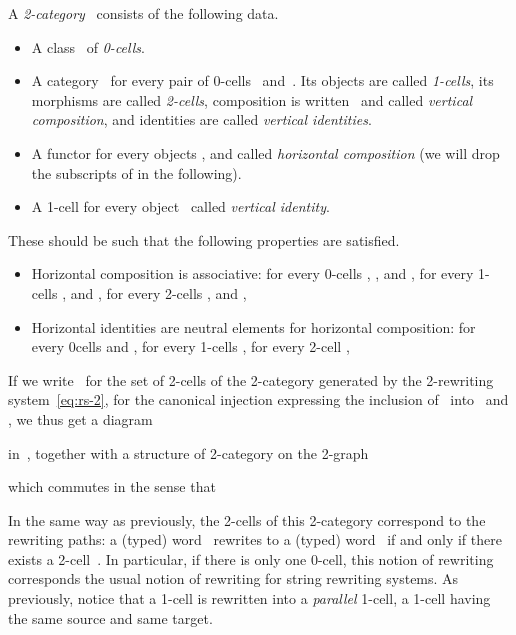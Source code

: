 \documentclass{LMCS}
\begin{document}
\begin{defi}
  \label{def:2-cat}
  A \emph{2-category}~ consists of the following data.
  \begin{itemize}
  \item A class~ of \emph{0-cells}.
  \item A category~ for every pair of 0-cells~ and~. Its objects
     are called \emph{1-cells}, its morphisms 
    are called \emph{2-cells}, composition is written~ and called
    \emph{vertical composition}, and identities are called \emph{vertical
      identities}.
  \item A functor  for every
    objects ,  and  called \emph{horizontal composition} (we will drop
    the subscripts of  in the following).
  \item A 1-cell  for every object~ called \emph{vertical
      identity}.
  \end{itemize}
  These should be such that the following properties are satisfied.
  \begin{itemize}
  \item Horizontal composition is associative: for every 0-cells , , 
    and , for every 1-cells ,  and ,
    for every 2-cells ,  and ,
    
  \item Horizontal identities are neutral elements for horizontal composition:
    for every 0\nbd{}cells  and , for every 1-cells , for
    every 2-cell ,
    
  \end{itemize}
\end{defi}



If we write~ for the set of 2-cells of the 2-category generated by the
2-rewriting system~\eqref{eq:rs-2},  for the canonical
injection expressing the inclusion of~ into~ and
, we thus get a diagram

in~, together with a structure of 2-category on the 2-graph

which commutes in the sense that


In the same way as previously, the 2-cells of this 2-category correspond to the
rewriting paths: a (typed) word~ rewrites to a (typed) word~
if and only if there exists a 2-cell~. In particular, if
there is only one 0-cell, this notion of rewriting corresponds the usual notion
of rewriting for string rewriting systems. As previously, notice that a 1-cell
is rewritten into a \emph{parallel} 1-cell, \ie a 1-cell having the same source
and same target.
\end{document}
